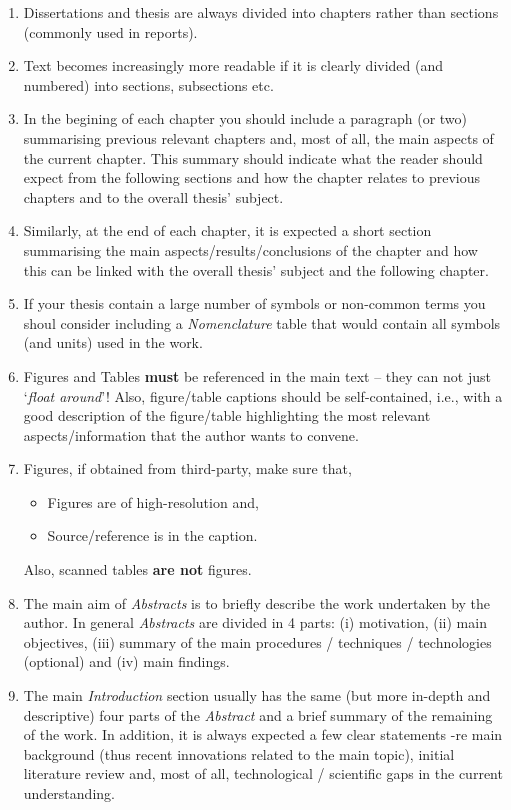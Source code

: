\documentclass[14pt,twoside]{report}
\begin{document}
 
\begin{enumerate}
%
\item Dissertations and thesis are always divided into chapters rather than sections (commonly used in reports). 
%
\item Text becomes increasingly more readable if it is clearly divided (and numbered) into sections, subsections etc.  
%
\item In the begining of each chapter you should include a paragraph (or two) summarising previous relevant chapters and, most of all, the main aspects of the current chapter. This summary should indicate what the reader should expect from the following sections and how the chapter relates to previous chapters and to the overall thesis' subject.
%
\item Similarly, at the end of each chapter, it is expected a short section summarising the main aspects/results/conclusions of the chapter and how this can be linked with the overall thesis' subject and the following chapter.
%
\item If your thesis contain a large number of symbols or non-common terms you shoul consider including a {\it Nomenclature} table that would contain all symbols (and units) used in the work. 
%
\item Figures and Tables {\bf must} be referenced in the main text -- they can not just `{\it float around}'! Also, figure/table captions should be self-contained, i.e., with a good description of the figure/table highlighting the most relevant aspects/information that the author wants to convene. 
%
\item Figures, if obtained from third-party, make sure that,
\begin{itemize}
\item Figures are of high-resolution and,
\item Source/reference is in the caption.
\end{itemize}
Also, scanned tables {\bf are not} figures.  
%
\item The main aim of {\it Abstracts} is to briefly describe the work undertaken by the author. In general {\it Abstracts} are divided in 4 parts: (i) motivation, (ii) main objectives, (iii) summary of the main procedures / techniques / technologies (optional) and (iv) main findings. 
%
\item The main {\it Introduction} section usually has the same (but more in-depth and descriptive) four parts of the {\it Abstract} and a brief summary of the remaining of the work. In addition, it is always expected a few clear statements -re main background (thus recent innovations related to the main topic), initial literature review and, most of all, technological / scientific gaps in the current understanding.

\end{enumerate}
\end{document}
